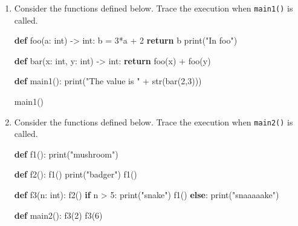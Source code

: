 \documentclass[]{article}
\newenvironment{Shaded}{}{}
\newcommand{\BuiltInTok}[1]{#1}
\newcommand{\ControlFlowTok}[1]{\textcolor[rgb]{0.00,0.44,0.13}{\textbf{#1}}}
\newcommand{\DecValTok}[1]{\textcolor[rgb]{0.25,0.63,0.44}{#1}}
\newcommand{\KeywordTok}[1]{\textcolor[rgb]{0.00,0.44,0.13}{\textbf{#1}}}
\newcommand{\NormalTok}[1]{#1}
\newcommand{\OperatorTok}[1]{\textcolor[rgb]{0.40,0.40,0.40}{#1}}
\newcommand{\StringTok}[1]{\textcolor[rgb]{0.25,0.44,0.63}{#1}}
\begin{document}
\begin{enumerate}
\def\labelenumi{\arabic{enumi}.}
\item
  Consider the functions defined below. Trace the execution when
  \texttt{main1()} is called.

\begin{Shaded}
\begin{Highlighting}[]
\KeywordTok{def}\NormalTok{ foo(a: }\BuiltInTok{int}\NormalTok{) }\OperatorTok{->} \BuiltInTok{int}\NormalTok{:}
\NormalTok{    b }\OperatorTok{=} \DecValTok{3}\OperatorTok{*}\NormalTok{a }\OperatorTok{+} \DecValTok{2}
    \ControlFlowTok{return}\NormalTok{ b}
    \BuiltInTok{print}\NormalTok{(}\StringTok{"In foo"}\NormalTok{)}

\KeywordTok{def}\NormalTok{ bar(x: }\BuiltInTok{int}\NormalTok{, y: }\BuiltInTok{int}\NormalTok{) }\OperatorTok{->} \BuiltInTok{int}\NormalTok{:}
    \ControlFlowTok{return}\NormalTok{ foo(x) }\OperatorTok{+}\NormalTok{ foo(y)}

\KeywordTok{def}\NormalTok{ main1():}
    \BuiltInTok{print}\NormalTok{(}\StringTok{"The value is "} \OperatorTok{+} \BuiltInTok{str}\NormalTok{(bar(}\DecValTok{2}\NormalTok{,}\DecValTok{3}\NormalTok{)))}

\NormalTok{main1()}
\end{Highlighting}
\end{Shaded}
\item
  Consider the functions defined below. Trace the execution when
  \texttt{main2()} is called.

\begin{Shaded}
\begin{Highlighting}[]
\KeywordTok{def}\NormalTok{ f1():}
    \BuiltInTok{print}\NormalTok{(}\StringTok{"mushroom"}\NormalTok{)}

\KeywordTok{def}\NormalTok{ f2():}
\NormalTok{    f1()}
    \BuiltInTok{print}\NormalTok{(}\StringTok{"badger"}\NormalTok{)}
\NormalTok{    f1()}

\KeywordTok{def}\NormalTok{ f3(n: }\BuiltInTok{int}\NormalTok{):}
\NormalTok{    f2()}
    \ControlFlowTok{if}\NormalTok{ n }\OperatorTok{>} \DecValTok{5}\NormalTok{:}
        \BuiltInTok{print}\NormalTok{(}\StringTok{"snake"}\NormalTok{)}
\NormalTok{        f1()}
    \ControlFlowTok{else}\NormalTok{:}
        \BuiltInTok{print}\NormalTok{(}\StringTok{"snaaaaake"}\NormalTok{)}

\KeywordTok{def}\NormalTok{ main2():}
\NormalTok{    f3(}\DecValTok{2}\NormalTok{)}
\NormalTok{    f3(}\DecValTok{6}\NormalTok{)}


\end{Highlighting}
\end{Shaded}
\end{enumerate}
\end{document}
